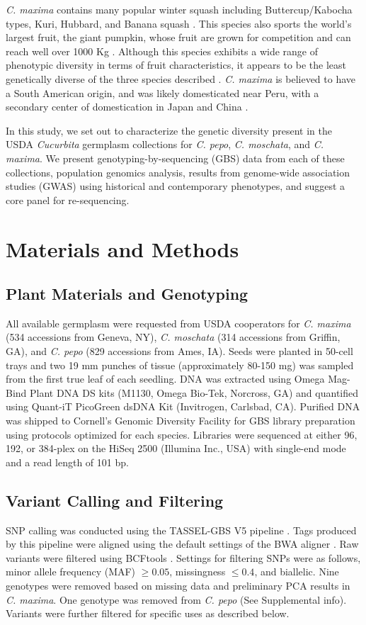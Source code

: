 \documentclass[utf8]{FrontiersinHarvard} %
\begin{document}
\emph{C. maxima} contains many popular winter squash including Buttercup/Kabocha types, Kuri, Hubbard, and Banana squash \citep{Ferriol}.
This species also sports the world's largest fruit, the giant pumpkin, whose fruit are grown for competition and can reach well over 1000 Kg \citep{Savage015}.
Although this species exhibits a wide range of phenotypic diversity in terms of fruit characteristics, it appears to be the least genetically diverse of the three species described \citep{Kates2017}.
\emph{C. maxima} is believed to have a South American origin, and was likely domesticated near Peru, with a secondary center of domestication in Japan and China \citep{Nee1990,Sun2017}.

In this study, we set out to characterize the genetic diversity present in the USDA \emph{Cucurbita} germplasm collections for \emph{C. pepo}, \emph{C. moschata}, and \emph{C. maxima}.
We present genotyping-by-sequencing (GBS) data from each of these collections, population genomics analysis, results from genome-wide association studies (GWAS) using historical and contemporary phenotypes, and suggest a core panel for re-sequencing.


\section{Materials and Methods}

\subsection{Plant Materials and Genotyping}
All available germplasm were requested from USDA cooperators for \textit{C. maxima} (534 accessions from Geneva, NY), \textit{C. moschata} (314 accessions from Griffin, GA), and \textit{C. pepo} (829 accessions from Ames, IA). Seeds were planted in 50-cell trays and two 19 mm punches of tissue (approximately 80-150 mg) was sampled from the first true leaf of each seedling. DNA was extracted using Omega Mag-Bind Plant DNA DS kits (M1130, Omega Bio-Tek, Norcross, GA) and quantified using Quant-iT PicoGreen dsDNA Kit (Invitrogen, Carlsbad, CA). Purified DNA was shipped to Cornell’s Genomic Diversity Facility for GBS library preparation using protocols optimized for each species. Libraries were sequenced at either 96, 192, or 384-plex on the HiSeq 2500 (Illumina Inc., USA) with single-end mode and a read length of 101 bp.

\subsection{Variant Calling and Filtering}
SNP calling was conducted using the TASSEL-GBS V5 pipeline \citep{Glaubitz2014}. Tags produced by this pipeline were aligned using the default settings of the BWA aligner \citep{Li2009}. Raw variants were filtered using BCFtools \citep{Danecek2021}. Settings for filtering SNPs were as follows, minor allele frequency (MAF) $\geq 0.05$, missingness $\leq 0.4$, and biallelic. Nine genotypes were removed based on missing data and preliminary PCA  results in \textit{C. maxima}. One genotype was removed from \textit{C. pepo} (See Supplemental info). Variants were further filtered for specific uses as described below.
\end{document}

